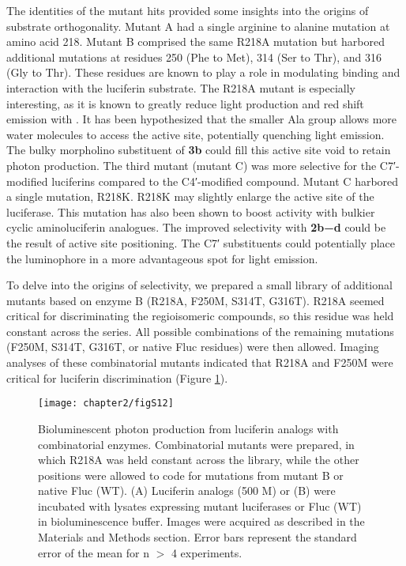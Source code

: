 The identities
of the mutant hits provided some insights into the origins of
substrate orthogonality. Mutant A had a single arginine to
alanine mutation at amino acid 218. Mutant B comprised the
same R218A mutation but harbored additional mutations at
residues 250 (Phe to Met), 314 (Ser to Thr), and 316 (Gly to
Thr). These residues are known to play a role in modulating
binding and interaction with the luciferin substrate. The R218A
mutant is especially interesting, as it is known to greatly reduce
light production and red shift emission with \dluciferin{}.\cite{BRANCHINI:2001gr} It has
been hypothesized that the smaller Ala group allows more
water molecules to access the active site, potentially quenching
light emission.\cite{BRANCHINI:2001gr} The bulky morpholino substituent of \textbf{3b} could
fill this active site void to retain photon production. The third
mutant (mutant C) was more selective for the C7′-modified
luciferins compared to the C4′-modified compound. Mutant C
harbored a single mutation, R218K. R218K may slightly enlarge
the active site of the luciferase. This mutation has also been
shown to boost activity with bulkier cyclic aminoluciferin
analogues.\cite{Harwood:2011gl} The improved selectivity with \textbf{2b−d} could be the
result of active site positioning. The C7′ substituents could
potentially place the luminophore in a more advantageous spot
for light emission.
\par
To delve into the origins of selectivity, we prepared a small
library of additional mutants based on enzyme B (R218A,
F250M, S314T, G316T). R218A seemed critical for discriminating
the regioisomeric compounds, so this residue was held
constant across the series. All possible combinations of the
remaining mutations (F250M, S314T, G316T, or native Fluc
residues) were then allowed. Imaging analyses of these
combinatorial mutants indicated that R218A and F250M
were critical for luciferin discrimination (Figure \ref{fig:muts_vs_cmpds}). 
\begin{figure}[htbp]
\texttt{[image: chapter2/figS12]}
\centering
\caption[Bioluminescent photon production from luciferin analogs with combinatorial enzymes]{Bioluminescent photon production from luciferin analogs with combinatorial enzymes. Combinatorial mutants were prepared, in which R218A was held constant across the library, while the other positions were allowed to code for mutations from mutant B or native Fluc (WT). (A) Luciferin analogs (500 \textmu{}M) or (B) \dluciferin{} were incubated with lysates expressing mutant luciferases or Fluc (WT) in bioluminescence buffer. Images were acquired as described in the Materials and Methods section. Error bars represent the standard error of the mean for n $>$ 4 experiments.}
  \label{fig:muts_vs_cmpds}
\end{figure}
